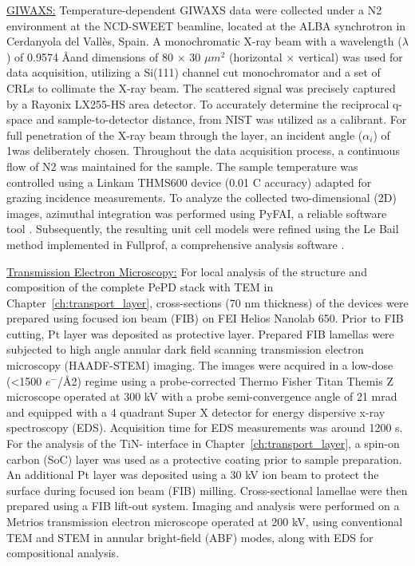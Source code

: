 \underline{GIWAXS:} Temperature-dependent GIWAXS data were collected under a N2 environment at the NCD-SWEET beamline, located at the ALBA synchrotron in Cerdanyola del Vallès, Spain. A monochromatic X-ray beam with a wavelength ($\lambda$) of 0.9574 \AA and dimensions of 80 × 30 $\mu m^2$ (horizontal $\times$ vertical) was used for data acquisition, utilizing a Si(111) channel cut monochromator and a set of CRLs to collimate the X-ray beam. The scattered signal was precisely captured by a Rayonix LX255-HS area detector. To accurately determine the reciprocal q-space and sample-to-detector distance,  from NIST was utilized as a calibrant. For full penetration of the X-ray beam through the layer, an incident angle ($\alpha_i$) of 1\degree was deliberately chosen. Throughout the data acquisition process, a continuous flow of N2 was maintained for the sample. The sample temperature was controlled using a Linkam THMS600 device (0.01 \degree C accuracy) adapted for grazing incidence measurements. To analyze the collected two-dimensional (2D) images, azimuthal integration was performed using PyFAI, a reliable software tool \cite{Ashiotis2015ThePyFAI}. Subsequently, the resulting unit cell models were refined using the Le Bail method implemented in Fullprof, a comprehensive analysis software \cite{Rodriguez-Carvajal1993RecentDiffraction}.

\underline{Transmission Electron Microscopy:} For local analysis of the structure and composition of the complete PePD stack with TEM in Chapter~\ref{ch:transport_layer}, cross-sections (70 nm thickness) of the devices were prepared using focused ion beam (FIB) on FEI Helios Nanolab 650. Prior to FIB cutting, Pt layer was deposited as protective layer. Prepared FIB lamellas were subjected to high angle annular dark field scanning transmission electron microscopy (HAADF-STEM) imaging. The images were acquired in a low-dose (<1500 $e^-$/\AA2) regime using a probe-corrected Thermo Fisher Titan Themis Z microscope operated at 300 kV with a probe semi-convergence angle of 21 mrad and equipped with a 4 quadrant Super X detector for energy dispersive x-ray spectroscopy (EDS). Acquisition time for EDS measurements was around 1200 s. For the analysis of the TiN- interface in Chapter~\ref{ch:transport_layer}, a spin-on carbon (SoC) layer was used as a protective coating prior to sample preparation. An additional Pt layer was deposited using a 30 kV ion beam to protect the surface during focused ion beam (FIB) milling. Cross-sectional lamellae were then prepared using a FIB lift-out system. Imaging and analysis were performed on a Metrios transmission electron microscope operated at 200 kV, using conventional TEM and STEM in annular bright-field (ABF) modes, along with EDS for compositional analysis.

